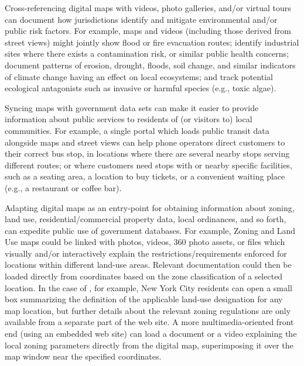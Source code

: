 \documentclass[10.5pt]{article}
\begin{document}
{\begin{description}[leftmargin=3pt, itemsep=-1pt]
\item[Emergency Management and Hazard Mitigation]  Cross-referencing digital maps with videos, 
photo galleries, and/or virtual tours can document how jurisdictions identify and 
mitigate environmental and/or public risk factors.  For example, maps and videos 
(including those derived from street views) might jointly show flood or fire evacuation 
routes; identify industrial sites where there exists a contamination risk, or similar 
public health concerns; document patterns of erosion, drought, floods, soil change, and 
similar indicators of climate change having an effect on local ecosystems; and track 
potential ecological antagonists such as invasive or harmful species (e.g., 
toxic algae).

\item[Government Services]  Syncing maps with government data sets can make it easier to 
provide information about public services to residents of (or visitors to) local 
communities.  For example, a single portal which loads public transit data alongside 
maps and street views can help phone operators direct customers to their correct 
bus stop, in locations where there are several nearby stops serving different 
routes; or where customers need stops with or nearby specific facilities, 
such as a seating area, a location to buy tickets, or a convenient waiting place 
(e.g., a restaurant or coffee bar).

\item[Zoning and Land Use]  Adapting digital maps as an entry-point for 
obtaining information about zoning, land use, residential/commercial 
property data, local ordinances, and so forth, can expedite public use of government databases.  
For example, Zoning and Land Use maps could be linked with photos, videos, 360\textdegree{} photo assets, 
or \PDF{} files which visually and/or interactively explain the restrictions/requirements 
enforced for locations within different land-use areas.  
Relevant documentation could then be loaded directly from \GIS{} coordinates based on the 
zone classification of a selected \GIS{} location.  In the case of \ZoLa{}, for example, 
New York City residents can open a small box summarizing the definition of the 
applicable land-use designation for any map location, but further details about 
the relevant zoning regulations are only available from a separate part of the 
web site.  A more multimedia-oriented front end (using an embedded web site) can 
load a \PDF{} document or a video explaining the local zoning parameters 
directly from the digital map, superimposing it over the map window near the specified 
\GIS{} coordinates.          


\end{description}}
\end{document}
